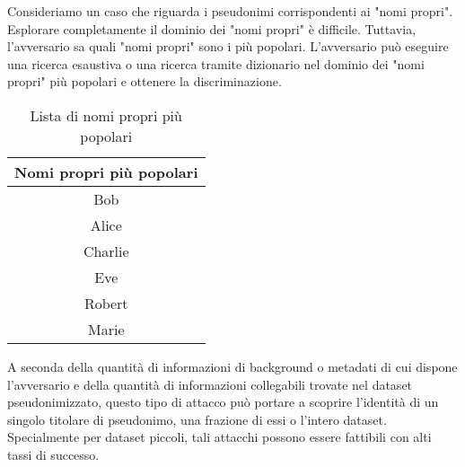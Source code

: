 Consideriamo un caso che riguarda i pseudonimi corrispondenti ai "nomi propri". Esplorare completamente il dominio dei "nomi propri" è difficile. Tuttavia, l'avversario sa quali "nomi propri" sono i più popolari. L'avversario può eseguire una ricerca esaustiva o una ricerca tramite dizionario nel dominio dei "nomi propri" più popolari e ottenere la discriminazione.

\begin{table}[h]
\centering
\begin{tabular}{|c|}
\hline
Nomi propri più popolari \\
\hline
Bob \\
Alice \\
Charlie \\
Eve \\
Robert \\
Marie \\
\hline
\end{tabular}
\caption{Lista di nomi propri più popolari}
\end{table}

A seconda della quantità di informazioni di background o metadati di cui dispone l'avversario e della quantità di informazioni collegabili trovate nel dataset pseudonimizzato, questo tipo di attacco può portare a scoprire l'identità di un singolo titolare di pseudonimo, una frazione di essi o l'intero dataset. Specialmente per dataset piccoli, tali attacchi possono essere fattibili con alti tassi di successo.

